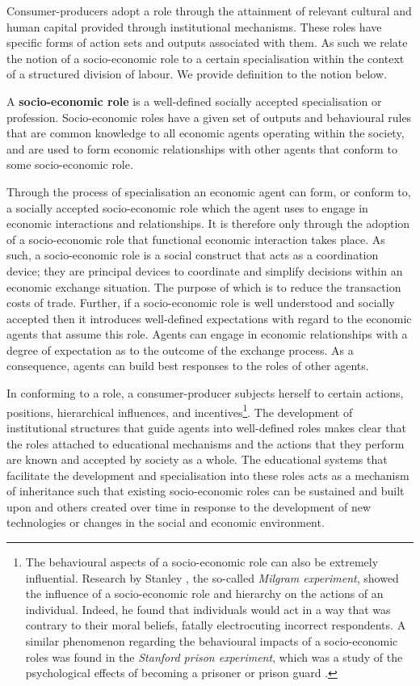 Consumer-producers adopt a role through the attainment of relevant cultural and human capital provided through institutional mechanisms. These roles have specific forms of action sets and outputs associated with them. As such we relate the notion of a socio-economic role to a certain specialisation within the context of a structured division of labour. We provide definition to the notion below.
\begin{definition} \label{def:role}
A \textbf{socio-economic role} is a well-defined socially accepted specialisation or profession. Socio-economic roles have a given set of outputs and behavioural rules that are common knowledge to all economic agents operating within the society, and are used to form economic relationships with other agents that conform to some socio-economic role.
\end{definition}
Through the process of specialisation an economic agent can form, or conform to, a socially accepted socio-economic role which the agent uses to engage in economic interactions and  relationships. It is therefore only through the adoption of a socio-economic role that functional economic interaction takes place. As such, a socio-economic role is a social construct that acts as a coordination device; they are principal devices to coordinate and simplify decisions within an economic exchange situation. The purpose of which is to reduce the transaction costs of trade. Further, if a socio-economic role is well understood and socially accepted then it introduces well-defined expectations with regard to the economic agents that assume this role. Agents can engage in economic relationships with a degree of expectation as to the outcome of the exchange process. As a consequence, agents can build best responses to the roles of other agents.

In conforming to a role, a consumer-producer subjects herself to certain actions, positions, hierarchical influences, and incentives\footnote{The behavioural aspects of a socio-economic role can also be extremely influential. Research by Stanley \citet{Milgram1963}, the so-called \emph{Milgram experiment}, showed the influence of a socio-economic role and hierarchy on the actions of an individual. Indeed, he found that individuals would act in a way that was contrary to their moral beliefs, fatally electrocuting incorrect respondents. A similar phenomenon regarding the behavioural impacts of a socio-economic roles was found in the \emph{Stanford prison experiment}, which was a study of the psychological effects of becoming a prisoner or prison guard \citep{Zimbardo1971}.}. The development of institutional structures that guide agents into well-defined roles makes clear that the roles attached to educational mechanisms and the actions that they perform are known and accepted by society as a whole. The educational systems that facilitate the development and specialisation into these roles acts as a mechanism of inheritance such that existing socio-economic roles can be sustained and built upon and others created over time in response to the development of new technologies or changes in the social and economic environment.

